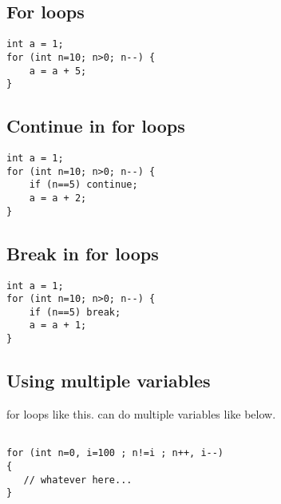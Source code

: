 
\subsection{For loops}



\begin{verbatim}
int a = 1;
for (int n=10; n>0; n--) {
    a = a + 5;
}
\end{verbatim}


\subsection{Continue in for loops}
\begin{verbatim}
int a = 1;
for (int n=10; n>0; n--) {
    if (n==5) continue;
    a = a + 2;
}
\end{verbatim}


\subsection{Break in for loops}
\begin{verbatim}
int a = 1;
for (int n=10; n>0; n--) {
    if (n==5) break;
    a = a + 1;
}
\end{verbatim}

\subsection{Using multiple variables}

for loops like this. can do multiple variables like below.

\begin{verbatim}

for (int n=0, i=100 ; n!=i ; n++, i--)
{
   // whatever here...
}
\end{verbatim}

